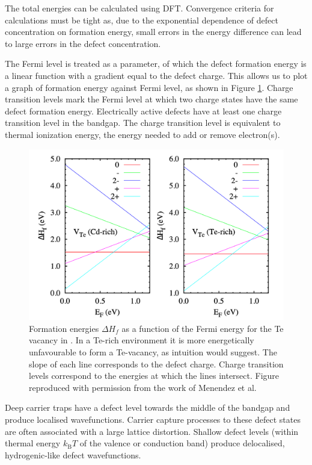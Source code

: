 The total energies can be calculated using DFT. Convergence criteria for calculations must be tight as, due to the exponential dependence of defect concentration on formation energy, small errors in the energy difference can lead to large errors in the defect concentration.

The Fermi level is treated as a parameter, of which the defect formation energy is a linear function with a gradient equal to the defect charge. This allows us to plot a graph of formation energy against Fermi level, as shown in Figure \ref{CdTeformation}. Charge transition levels mark the Fermi level at which two charge states have the same defect formation energy. Electrically active defects have at least one charge transition level in the bandgap. 
The charge transition level is equivalent to thermal ionization energy, the energy needed to add or remove electron(s). %

\begin{figure}[h]
\centering
  \includegraphics[width=0.8\columnwidth]{figures/ch3/defectenergetics.png}
  \caption[Formation energies of the Te vacancy in CdTe]{Formation energies $\Delta H_f$ as a function of the Fermi energy for the Te vacancy in . In a Te-rich environment it is more energetically unfavourable to form a Te-vacancy, as intuition would suggest. The slope of each line corresponds to the defect charge. Charge transition levels correspond to the energies at which the lines intersect. Figure reproduced with permission from the work of Menendez et al.\autocite{Menendez2016}}
  \label{CdTeformation}
\end{figure}%

Deep carrier traps have a defect level towards the middle of the bandgap and produce localised wavefunctions. Carrier capture processes to these defect states are often associated with a large lattice distortion. Shallow defect levels (within thermal energy $k_\mathrm{B}T$ of the valence or conduction band) produce delocalised, hydrogenic-like defect wavefunctions. 

